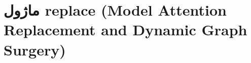 \section{ماژول replace (Model Attention Replacement and Dynamic Graph Surgery)}
\label{sec:module_replace}
